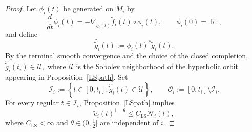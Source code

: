 \documentclass[10pt,a4paper]{amsart}
\begin{document}
\begin{proof}
\noindent Let \(\phi_i(t)\) be generated on \(\widetilde M_i\) by
\[
        \frac{d}{dt}\phi_i(t)
        =
        -\nabla_{\widetilde g_i(t)}
        \widetilde f_i(t)\circ\phi_i(t),
        \qquad
        \phi_i(0)=\operatorname{Id},
\]
and define
\[
        \widehat{\widetilde g}_i(t)
        :=
        \phi_i(t)^*\widetilde g_i(t).
\]
By the terminal smooth convergence and the choice of the closed
completion,
$\widehat{\widetilde g}_i(t_i)\in\mathcal U,$
where \(\mathcal U\) is the Sobolev neighborhood of the hyperbolic orbit
appearing in Proposition~\ref{LSpath}.  Set
\[
        \mathcal I_i
        :=
        \left\{
        t\in[0,t_i]:
        \widehat{\widetilde g}_i(t)\in\mathcal U
        \right\},
        \qquad
        \mathcal O_i
        :=
        [0,t_i]\setminus\mathcal I_i .
\]
For every regular \(t\in\mathcal I_i\), Proposition~\ref{LSpath}
implies
\begin{equation}
\label{eq:LS-on-pulled-back-core}
        \widetilde e_i(t)^{1-\theta}
        \leq
        C_{\mathrm{LS}}
        \widetilde{\mathcal N}_i(t),
\end{equation}
where \(C_{\mathrm{LS}}<\infty\) and
\(\theta\in(0,\frac12]\) are independent of \(i\).


\end{proof}
\end{document}
